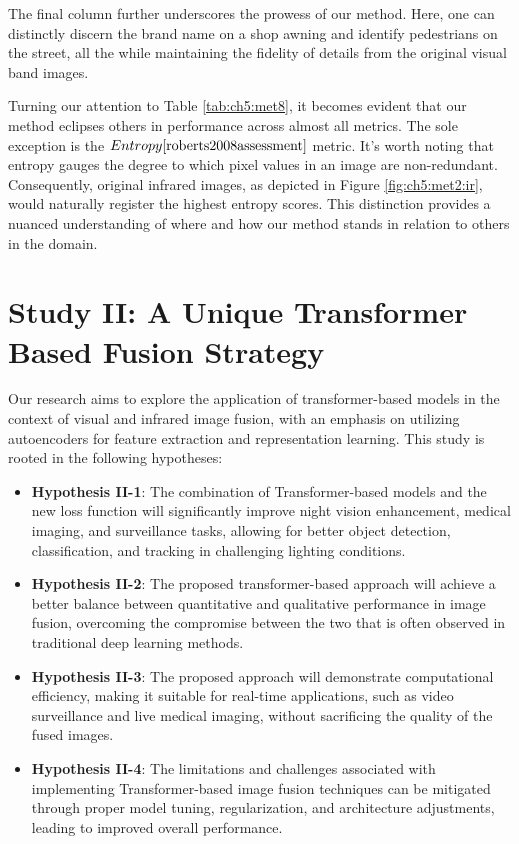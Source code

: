 The final column further underscores the prowess of our method. Here, one can distinctly discern the brand name on a shop awning and identify pedestrians on the street, all the while maintaining the fidelity of details from the original visual band images.

Turning our attention to Table \ref{tab:ch5:met8}, it becomes evident that our method eclipses others in performance across almost all metrics. The sole exception is the \(Entropy\cite{roberts2008assessment}\) metric. It's worth noting that entropy gauges the degree to which pixel values in an image are non-redundant. Consequently, original infrared images, as depicted in Figure \ref{fig:ch5:met2:ir}, would naturally register the highest entropy scores. This distinction provides a nuanced understanding of where and how our method stands in relation to others in the domain. 

\section{Study II: A Unique Transformer Based Fusion Strategy}\label{sec:study1}

Our research aims to explore the application of transformer-based models in the context of visual and infrared image fusion, with an emphasis on utilizing autoencoders for feature extraction and representation learning. This study is rooted in the following hypotheses:

\begin{itemize}
    \item \textbf{Hypothesis II-1}: The combination of Transformer-based models and the new loss function will significantly improve night vision enhancement, medical imaging, and surveillance tasks, allowing for better object detection, classification, and tracking in challenging lighting conditions.
    
    \item \textbf{Hypothesis II-2}: The proposed transformer-based approach will achieve a better balance between quantitative and qualitative performance in image fusion, overcoming the compromise between the two that is often observed in traditional deep learning methods.
    
    \item \textbf{Hypothesis II-3}: The proposed approach will demonstrate computational efficiency, making it suitable for real-time applications, such as video surveillance and live medical imaging, without sacrificing the quality of the fused images.
    
    \item \textbf{Hypothesis II-4}: The limitations and challenges associated with implementing Transformer-based image fusion techniques can be mitigated through proper model tuning, regularization, and architecture adjustments, leading to improved overall performance.
\end{itemize}

